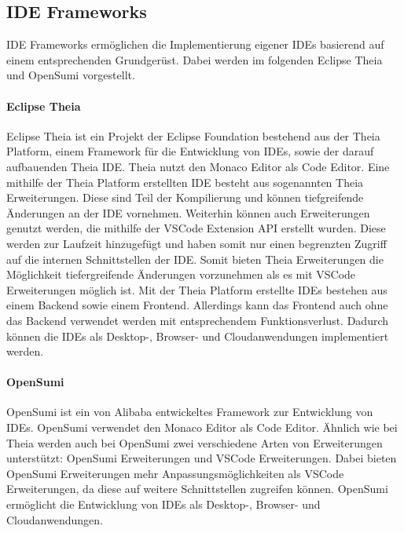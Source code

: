 \subsection{IDE Frameworks}\label{section:stand-der-technik:weitere-entwicklungen:ide-frameworks}

IDE Frameworks ermöglichen die Implementierung eigener IDEs basierend auf einem entsprechenden Grundgerüst. Dabei werden im folgenden Eclipse Theia \cite{noauthor_theia_nodate} und OpenSumi \cite{noauthor_opensumi_nodate} vorgestellt.

\paragraph{Eclipse Theia}
Eclipse Theia \cite{noauthor_theia_nodate} ist ein Projekt der Eclipse Foundation \cite{milinkovich_eclipse-foundation_nodate} bestehend aus der Theia Platform, einem Framework für die Entwicklung von IDEs, sowie der darauf aufbauenden Theia IDE. Theia nutzt den Monaco Editor \cite{noauthor_monaco_nodate} als Code Editor. Eine mithilfe der Theia Platform erstellten IDE besteht aus sogenannten Theia Erweiterungen. Diese sind Teil der Kompilierung und können tiefgreifende Änderungen an der IDE vornehmen. Weiterhin können auch Erweiterungen genutzt werden, die mithilfe der VSCode Extension API \cite{noauthor_vscode-extension-api_nodate} erstellt wurden. Diese werden zur Laufzeit hinzugefügt und haben somit nur einen begrenzten Zugriff auf die internen Schnittstellen der IDE. Somit bieten Theia Erweiterungen die Möglichkeit tiefergreifende Änderungen vorzunehmen als es mit VSCode Erweiterungen möglich ist. Mit der Theia Platform erstellte IDEs bestehen aus einem Backend sowie einem Frontend. Allerdings kann das Frontend auch ohne das Backend verwendet werden mit entsprechendem Funktionsverlust. Dadurch können die IDEs als Desktop-, Browser- und Cloudanwendungen implementiert werden.

\paragraph{OpenSumi}
OpenSumi \cite{noauthor_opensumi_nodate} ist ein von Alibaba \cite{noauthor_alibaba_nodate} entwickeltes Framework zur Entwicklung von IDEs. OpenSumi verwendet den Monaco Editor \cite{noauthor_monaco_nodate} als Code Editor. Ähnlich wie bei Theia werden auch bei OpenSumi zwei verschiedene Arten von Erweiterungen unterstützt: OpenSumi Erweiterungen und VSCode Erweiterungen. Dabei bieten OpenSumi Erweiterungen mehr Anpassungsmöglichkeiten als VSCode Erweiterungen, da diese auf weitere Schnittstellen zugreifen können. OpenSumi ermöglicht die Entwicklung von IDEs als Desktop-, Browser- und Cloudanwendungen.

